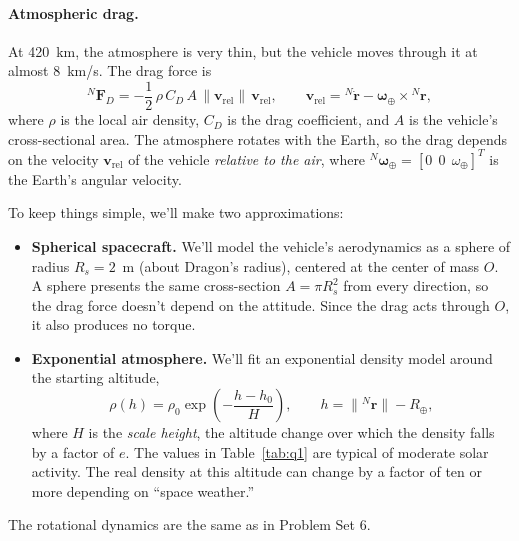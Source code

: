 \documentclass[11pt,letterpaper]{article}
\newcommand{\bF}{\mathbf{F}}
\newcommand{\Nr}{{}^{N}\mathbf{r}}
\newcommand{\Nrd}{{}^{N}\dot{\mathbf{r}}}
\newcommand{\vrel}{\mathbf{v}_{\text{rel}}}
\newcommand{\bomE}{\boldsymbol{\omega}_{\oplus}}
\begin{document}
\paragraph{Atmospheric drag.} At 420~km, the atmosphere is very thin, but the vehicle moves through it at almost 8~km/s. The drag force is
\begin{equation}
{}^{N}\bF_D = -\frac12\,\rho\,C_D\,A\,\lVert\vrel\rVert\,\vrel,
\qquad
\vrel = \Nrd - \bomE\times\Nr,
\label{eq:drag}
\end{equation}
where $\rho$ is the local air density, $C_D$ is the drag coefficient, and $A$ is the vehicle's cross-sectional area. The atmosphere rotates with the Earth, so the drag depends on the velocity $\vrel$ of the vehicle \emph{relative to the air}, where ${}^{N}\bomE = [0\;\,0\;\,\omega_\oplus]^T$ is the Earth's angular velocity.

To keep things simple, we'll make two approximations:
\begin{itemize}
    \item \textbf{Spherical spacecraft.} We'll model the vehicle's aerodynamics as a sphere of radius $R_s = 2$~m (about Dragon's radius), centered at the center of mass $O$. A sphere presents the same cross-section $A = \pi R_s^2$ from every direction, so the drag force doesn't depend on the attitude. Since the drag acts through $O$, it also produces no torque.
    \item \textbf{Exponential atmosphere.} We'll fit an exponential density model around the starting altitude,
    \begin{equation}
    \rho(h) = \rho_0 \exp\!\left(-\frac{h - h_0}{H}\right), \qquad h = \lVert\Nr\rVert - R_\oplus,
    \label{eq:rho}
    \end{equation}
    where $H$ is the \emph{scale height}, the altitude change over which the density falls by a factor of $e$. The values in Table~\ref{tab:q1} are typical of moderate solar activity. The real density at this altitude can change by a factor of ten or more depending on ``space weather.''
\end{itemize}
The rotational dynamics are the same as in Problem Set 6.
\end{document}
